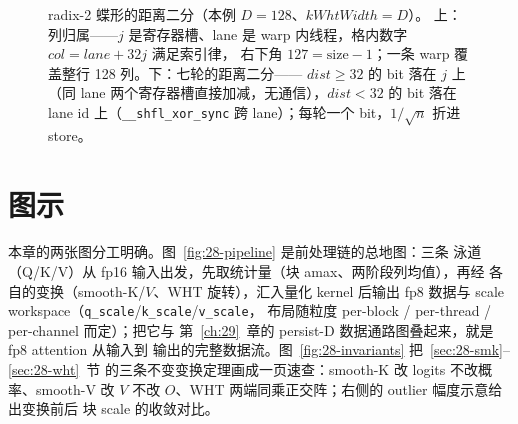\begin{figure}[H]
\caption{radix-2 蝶形的距离二分（本例 $D{=}128$、$kWhtWidth{=}D$）。
上：列归属——$j$ 是寄存器槽、lane 是 warp 内线程，格内数字 $col=lane+32j$ 满足索引律，
右下角 $127=\mathrm{size}-1$；一条 warp 覆盖整行 128 列。下：七轮的距离二分——
$dist\ge32$ 的 bit 落在 $j$ 上（同 lane 两个寄存器槽直接加减，无通信），$dist<32$ 的 bit
落在 lane id 上（\texttt{\_\_shfl\_xor\_sync} 跨 lane）；每轮一个 bit，$1/\sqrt n$ 折进
store。}
\label{fig:28-wht-butterfly}
\end{figure}

\section{图示}

本章的两张图分工明确。图~\ref{fig:28-pipeline} 是前处理链的总地图：三条
泳道（Q/K/V）从 fp16 输入出发，先取统计量（块 amax、两阶段列均值），再经
各自的变换（smooth-K/$V$、WHT 旋转），汇入量化 kernel 后输出 fp8 数据与
scale workspace（\texttt{q\_scale}/\texttt{k\_scale}/\texttt{v\_scale}，
布局随粒度 per-block / per-thread / per-channel 而定）；把它与
第~\ref{ch:29}~章的 persist-D 数据通路图叠起来，就是 fp8 attention 从输入到
输出的完整数据流。图~\ref{fig:28-invariants} 把~\ref{sec:28-smk}--\ref{sec:28-wht}~节
的三条不变变换定理画成一页速查：smooth-K 改 logits 不改概率、smooth-V 改
$V$ 不改 $O$、WHT 两端同乘正交阵；右侧的 outlier 幅度示意给出变换前后
块 scale 的收敛对比。

